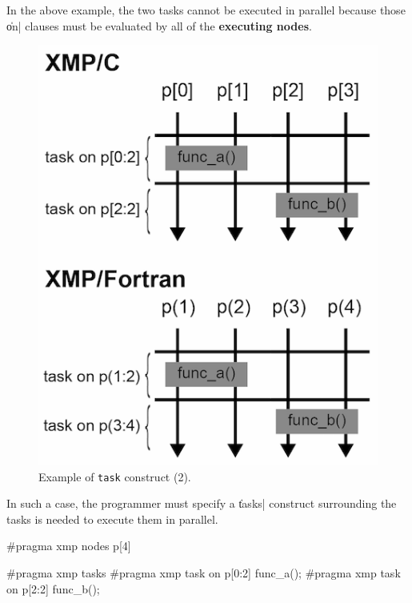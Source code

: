 In the above example, the two tasks cannot be executed in parallel
because those \|on| clauses must be evaluated by all of the {\bf
executing nodes}.

\begin{figure}
  \centering
  \includegraphics[width=0.9\columnwidth]{figs/task_noparallel.png}
  \caption{Example of {\tt task} construct (2).}
\end{figure}

In such a case, the programmer must specify a \|tasks| construct
surrounding the tasks is needed to execute them in parallel.

\begin{XCexample}
#pragma xmp nodes p[4]

#pragma xmp tasks
{
#pragma xmp task on p[0:2]
{
  func_a();
}
#pragma xmp task on p[2:2]
{
  func_b();
}
}
\end{XCexample}


